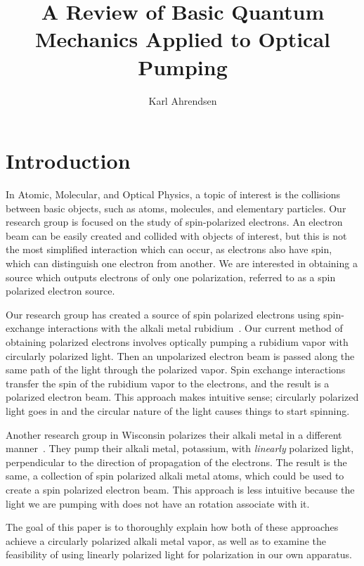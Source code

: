 \documentclass[12pt]{article}
\begin{document}
\title{A Review of Basic Quantum Mechanics Applied to Optical Pumping}
\author{Karl Ahrendsen}
\maketitle{}

\section{Introduction}
In Atomic, Molecular,
and Optical Physics, a topic of interest is the collisions between
basic 
objects, such as atoms, molecules, and elementary particles.
Our research group is focused on the study of spin-polarized electrons. 
An electron beam can be easily created and collided
with objects of interest,
but this is not the most simplified interaction
which can occur, as electrons also have spin, which can distinguish one 
electron from another. We are interested in obtaining a source which
outputs electrons of only one polarization, referred to as a spin
polarized electron source.

Our research group has created a source of spin polarized
electrons using spin-exchange interactions with the alkali metal
rubidium~\cite{rbSource}.  Our current method of obtaining 
polarized electrons involves optically pumping a rubidium vapor
with circularly polarized light. Then an unpolarized electron beam
is passed along the same path of the light 
through the polarized vapor. Spin exchange interactions
transfer the spin of the rubidium vapor to the electrons, and the 
result is a polarized electron beam. This approach makes intuitive
sense; circularly polarized light goes in and the circular
nature of the light causes things to start spinning.

Another research group in Wisconsin polarizes their alkali metal
in a different manner~\cite{swenson}. They pump their alkali metal, 
potassium, with
\emph{linearly} polarized light, perpendicular to the direction
of propagation of the electrons. The result is the same, a collection
of spin polarized alkali metal atoms, which could be used to create
a spin polarized electron beam. This approach is less intuitive
because the light we are pumping with does not have an rotation 
associate with it.

The goal of this paper is to thoroughly
explain how both of these approaches achieve a circularly polarized
alkali metal vapor, as well 
as to examine the feasibility of using linearly polarized light
for polarization in our own apparatus.
\end{document}
